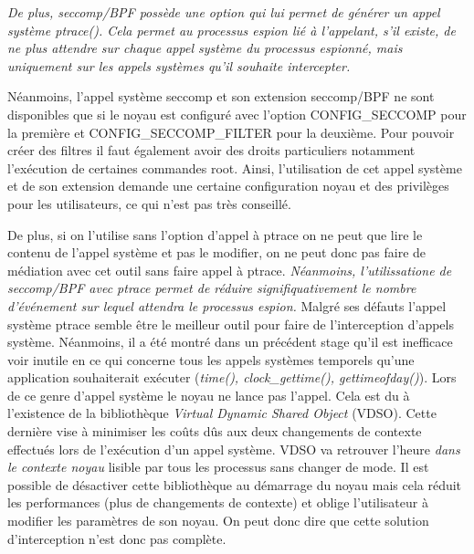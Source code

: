 \textit{ De plus, seccomp/BPF possède une option qui lui permet de générer un
  appel système ptrace(). Cela permet au processus espion lié à l'appelant, s'il
  existe, de ne plus attendre sur chaque appel système du processus espionné,
  mais uniquement sur les appels systèmes qu'il souhaite intercepter.}

Néanmoins, l'appel système seccomp et son extension seccomp/BPF ne sont
disponibles que si le noyau est configuré avec l'option CONFIG\_SECCOMP pour la
première et CONFIG\_SECCOMP\_FILTER pour la deuxième. Pour pouvoir créer des
filtres il faut également avoir des droits particuliers notamment l'exécution de
certaines commandes root. Ainsi, l'utilisation de cet appel système et de son
extension demande une certaine configuration noyau et des privilèges pour les
utilisateurs, ce qui n'est pas très conseillé.

De plus, si on l'utilise sans l'option d'appel à ptrace on ne peut que lire le
contenu de l'appel système et pas le modifier, on ne peut donc pas faire de
médiation avec cet outil sans faire appel à ptrace. \textit{Néanmoins,
  l'utilissatione de seccomp/BPF avec ptrace permet de réduire
  signifiquativement le nombre d'événement sur lequel attendra le processus
  espion.}
\newline
Malgré ses défauts l'appel système ptrace semble être le meilleur outil pour
faire de l'interception d'appels système. Néanmoins, il a été montré dans un
précédent stage \citet{INTERCEPTION:MARION} qu'il est
inefficace voir inutile en ce qui concerne tous les appels systèmes temporels
qu'une application souhaiterait exécuter (\textit{time(), clock\_gettime(),
  gettimeofday()}). Lors de ce genre d'appel système le noyau ne lance pas
l'appel. Cela est du à l'existence de la bibliothèque \textit{Virtual Dynamic
  Shared Object} (VDSO). Cette dernière vise à minimiser les coûts dûs aux deux
changements de contexte effectués lors de l'exécution d'un appel système. VDSO
va retrouver l'heure \textit{{\color{red}dans le contexte noyau}} lisible par tous les
processus sans changer de mode. Il est possible de désactiver cette bibliothèque
au démarrage du noyau mais cela réduit les performances (plus de changements de
contexte) et oblige l'utilisateur à modifier les paramètres de son noyau. On
peut donc dire que cette solution d'interception n'est donc pas complète.


